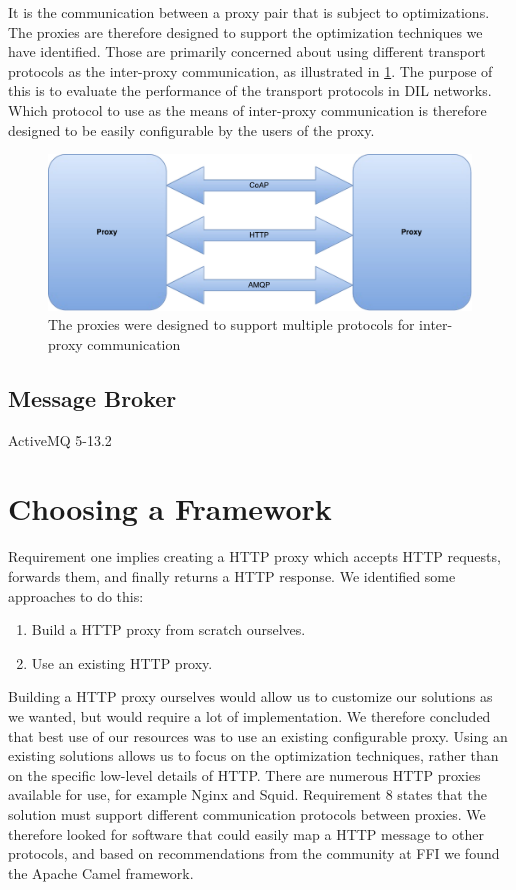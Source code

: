 It is the communication between a proxy pair that is subject to optimizations.
The proxies are therefore designed to support the optimization techniques we
have identified. Those are primarily concerned about using different transport
protocols as the inter-proxy communication, as illustrated in
\cref{figure:proxy-communication}. The purpose of this is to evaluate the
performance of the transport protocols in DIL networks. Which protocol to use as
the means of inter-proxy communication is therefore designed to be easily
configurable by the users of the proxy.

\begin{figure}[h]
\includegraphics[scale=0.5]{images/proxy_communcation.pdf}
\caption{The proxies were designed to support multiple protocols for inter-proxy communication}
\label{figure:proxy-communication}
\end{figure}

\subsection{Message Broker}

ActiveMQ 5-13.2

\section{Choosing a Framework}

Requirement one implies creating a HTTP proxy which accepts HTTP requests,
forwards them, and finally returns a HTTP response. We identified some
approaches to do this:

\begin{enumerate}
    \item Build a HTTP proxy from scratch ourselves.
    \item Use an existing HTTP proxy.
\end{enumerate}

Building a HTTP proxy ourselves would allow us to customize our solutions as we
wanted, but would require a lot of implementation. We therefore concluded that
best use of our resources was to use an existing configurable proxy. Using an
existing solutions allows us to focus on the optimization techniques, rather
than on the specific low-level details of HTTP. There are numerous HTTP proxies
available for use, for example Nginx\cite{nginx-homepage} and
Squid\cite{squid-homepage}. Requirement 8 states that the solution must support
different communication protocols between proxies. We therefore looked for
software that could easily map a HTTP message to other protocols, and based on
recommendations from the community at FFI we found the Apache Camel framework.

